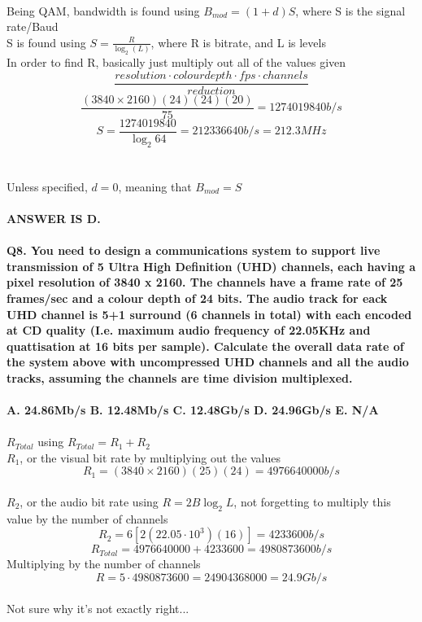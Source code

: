 \documentclass[12pt]{article}
\begin{document}
\\
Being QAM, bandwidth is found using \(B_{mod} = (1 + d)S\), where S is the signal rate/Baud\\
S is found using \(S = \frac{R}{\log_2(L)}\), where R is bitrate, and L is levels\\
In order to find R, basically just multiply out all of the values given\\
\[\frac{resolution \cdot colour depth \cdot fps \cdot channels}{reduction}\]
\[\frac{(3840 \times 2160)(24)(24)(20)}{75} = 1274019840b/s\]
\[S = \frac{1274019840}{\log_2 64} = 212336640b/s = 212.3MHz\]\\
\\
Unless specified, \(d = 0\), meaning that \(B_{mod} = S\)\\
\\
\textbf{ANSWER IS D.}\\
\\
\textbf{Q8. You need to design a communications system to support live transmission of 5 Ultra High Definition (UHD) channels, each having a pixel resolution of 3840 x 2160. The channels have a frame rate of 25 frames/sec and a colour depth of 24 bits. The audio track for eack UHD channel is 5+1 surround (6 channels in total) with each encoded at CD quality (I.e. maximum audio frequency of 22.05KHz and quattisation at 16 bits per sample). Calculate the overall data rate of the system above with uncompressed UHD channels and all the audio tracks, assuming the channels are time division multiplexed.\\
\\
A. 24.86Mb/s B. 12.48Mb/s C. 12.48Gb/s D. 24.96Gb/s E. N/A}\\
\\
\(R_{Total}\) using \(R_{Total} = R_1 + R_2\)\\
\(R_1\), or the visual bit rate by multiplying out the values\\
\[R_1 = (3840 \times 2160)(25)(24) = 4976640000b/s\]\\
\(R_2\), or the audio bit rate using \(R = 2B\log_2L\), not forgetting to multiply this value by the number of channels\\
\[R_2 = 6[2(22.05 \cdot 10^3)(16)] = 4233600b/s\]
\[R_{Total} = 4976640000 + 4233600 = 4980873600b/s \]
Multiplying by the number of channels\\
\[R = 5 \cdot 4980873600 = 24904368000 = 24.9Gb/s\]\\
Not sure why it's not exactly right...\\
\\
\end{document}
